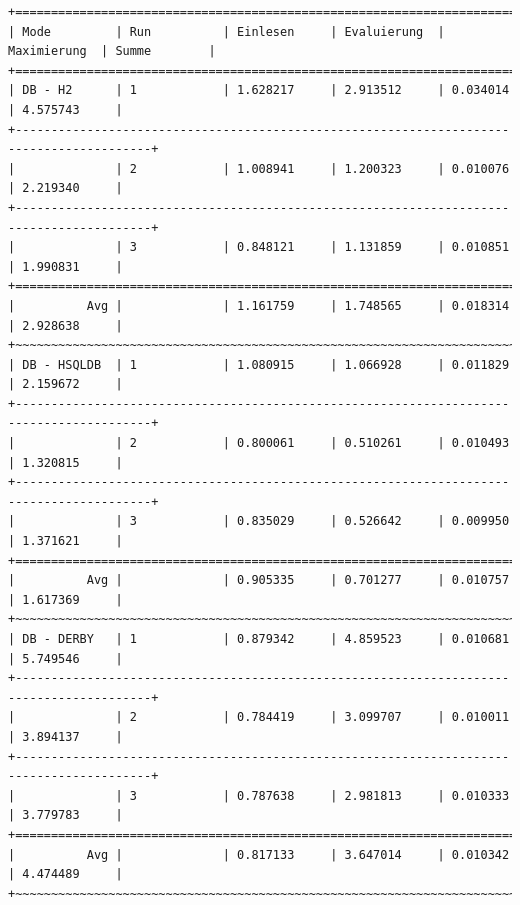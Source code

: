 \documentclass[draft,final]{vutinfth} %
\begin{document}
\begin{lstlisting}[float,basicstyle=\tiny,caption={Benchmark DB \textbf{mit} Indizes, Datei: lubm-ex-20-17.sparql.xml},label={lst:dbmi17}]
+=========================================================================================+
| Mode         | Run          | Einlesen     | Evaluierung  | Maximierung  | Summe        | 
+=========================================================================================+
| DB - H2      | 1            | 1.628217     | 2.913512     | 0.034014     | 4.575743     | 
+-----------------------------------------------------------------------------------------+
|              | 2            | 1.008941     | 1.200323     | 0.010076     | 2.219340     | 
+-----------------------------------------------------------------------------------------+
|              | 3            | 0.848121     | 1.131859     | 0.010851     | 1.990831     | 
+=========================================================================================+
|          Avg |              | 1.161759     | 1.748565     | 0.018314     | 2.928638     | 
+~~~~~~~~~~~~~~~~~~~~~~~~~~~~~~~~~~~~~~~~~~~~~~~~~~~~~~~~~~~~~~~~~~~~~~~~~~~~~~~~~~~~~~~~~+
| DB - HSQLDB  | 1            | 1.080915     | 1.066928     | 0.011829     | 2.159672     | 
+-----------------------------------------------------------------------------------------+
|              | 2            | 0.800061     | 0.510261     | 0.010493     | 1.320815     | 
+-----------------------------------------------------------------------------------------+
|              | 3            | 0.835029     | 0.526642     | 0.009950     | 1.371621     | 
+=========================================================================================+
|          Avg |              | 0.905335     | 0.701277     | 0.010757     | 1.617369     | 
+~~~~~~~~~~~~~~~~~~~~~~~~~~~~~~~~~~~~~~~~~~~~~~~~~~~~~~~~~~~~~~~~~~~~~~~~~~~~~~~~~~~~~~~~~+
| DB - DERBY   | 1            | 0.879342     | 4.859523     | 0.010681     | 5.749546     | 
+-----------------------------------------------------------------------------------------+
|              | 2            | 0.784419     | 3.099707     | 0.010011     | 3.894137     | 
+-----------------------------------------------------------------------------------------+
|              | 3            | 0.787638     | 2.981813     | 0.010333     | 3.779783     | 
+=========================================================================================+
|          Avg |              | 0.817133     | 3.647014     | 0.010342     | 4.474489     | 
+~~~~~~~~~~~~~~~~~~~~~~~~~~~~~~~~~~~~~~~~~~~~~~~~~~~~~~~~~~~~~~~~~~~~~~~~~~~~~~~~~~~~~~~~~+
\end{lstlisting}
\end{document}
